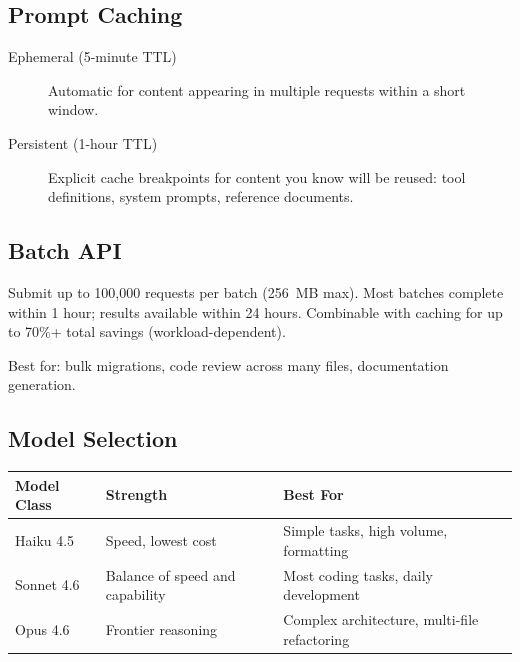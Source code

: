 \subsection{Prompt Caching}


\begin{description}
  \item[Ephemeral (5-minute TTL)] Automatic for content appearing in
    multiple requests within a short window.
  \item[Persistent (1-hour TTL)] Explicit cache breakpoints for content you know
    will be reused: tool definitions, system prompts, reference documents.
\end{description}

\subsection{Batch API}

Submit up to 100,000 requests per batch (256~MB max).
Most batches complete within 1 hour; results available within 24 hours.
Combinable with caching for up to 70\%+ total savings (workload-dependent).

Best for: bulk migrations, code review across many files, documentation generation.

\subsection{Model Selection}

\begin{fullwidth}
\begin{tabular}{@{}llp{6cm}@{}}
\toprule
\textbf{Model Class} & \textbf{Strength} & \textbf{Best For} \\
\midrule
Haiku 4.5 & Speed, lowest cost & Simple tasks, high volume, formatting \\
Sonnet 4.6 & Balance of speed and capability & Most coding tasks, daily development \\
Opus 4.6 & Frontier reasoning & Complex architecture, multi-file refactoring \\
\bottomrule
\end{tabular}
\end{fullwidth}

